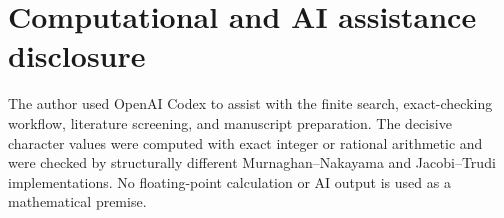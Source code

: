 \documentclass[11pt]{article}
\begin{document}
\section*{Computational and AI assistance disclosure}

The author used OpenAI Codex to assist with the finite search, exact-checking
workflow, literature screening, and manuscript preparation.  The decisive
character values were computed with exact integer or rational arithmetic and
were checked by structurally different Murnaghan--Nakayama and
Jacobi--Trudi implementations.  No floating-point calculation or AI output is
used as a mathematical premise.



\end{document}
